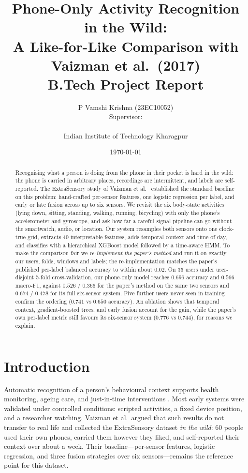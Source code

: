 \documentclass[11pt,a4paper]{article}
\title{\textbf{Phone-Only Activity Recognition in the Wild:\\
A Like-for-Like Comparison with Vaizman et al.\ (2017)}\\[6pt]
\large B.Tech Project Report}
\author{%
  P Vamshi Krishna (23EC10052)\\[2pt]
  Supervisor: \supervisor\\[2pt]
  \department\\
  Indian Institute of Technology Kharagpur%
}
\date{\today}
\begin{document}
\maketitle

\begin{abstract}
\noindent
Recognising what a person is doing from the phone in their pocket is hard in the
wild: the phone is carried in arbitrary places, recordings are intermittent, and
labels are self-reported. The ExtraSensory study of Vaizman et al.\ \cite{vaizman2017}
established the standard baseline on this problem: hand-crafted per-sensor features,
one logistic regression per label, and early or late fusion across up to six sensors.
We revisit the six body-state activities (lying down, sitting, standing, walking,
running, bicycling) with only the phone's accelerometer and gyroscope, and ask how far
a careful signal pipeline can go without the smartwatch, audio, or location. Our system
resamples both sensors onto one clock-true grid, extracts 40 interpretable features,
adds temporal context and time of day, and classifies with a hierarchical XGBoost model
followed by a time-aware HMM. To make the comparison fair we \emph{re-implement the
paper's method} and run it on exactly our users, folds, windows and labels; the
re-implementation matches the paper's published per-label balanced accuracy to within
about $0.02$. On 35 users under user-disjoint 5-fold cross-validation, our phone-only
model reaches $0.696$ accuracy and $0.566$ macro-F1, against $0.526$ / $0.366$ for the
paper's method on the same two sensors and $0.674$ / $0.478$ for its full six-sensor
system. Five further users never seen in training confirm the ordering ($0.741$ vs
$0.650$ accuracy). An ablation shows that temporal context, gradient-boosted trees, and
early fusion account for the gain, while the paper's own per-label metric still favours
its six-sensor system ($0.776$ vs $0.744$), for reasons we explain.
\end{abstract}

\section{Introduction}

Automatic recognition of a person's behavioural context supports health monitoring,
ageing care, and just-in-time interventions \cite{vaizman2017}. Most early systems were
validated under controlled conditions: scripted activities, a fixed device position,
and a researcher watching. Vaizman et al.\ argued that such results do not transfer to
real life and collected the ExtraSensory dataset \emph{in the wild}: 60 people used their
own phones, carried them however they liked, and self-reported their context over about
a week. Their baseline---per-sensor features, logistic regression, and three fusion
strategies over six sensors---remains the reference point for this dataset.
\end{document}
